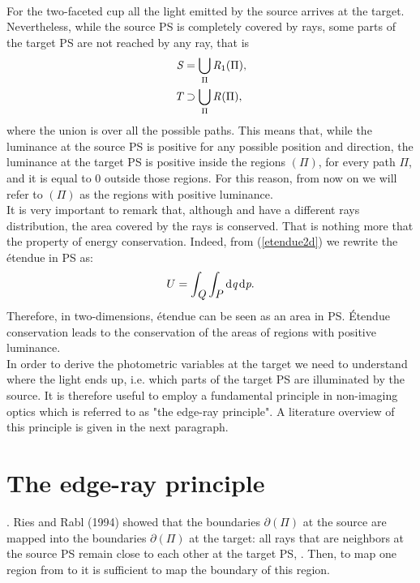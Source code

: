 \\ \indent For the two-faceted cup all the light emitted by the source arrives at the target. Nevertheless, while the source PS is completely covered by rays, some parts of the target PS are not reached by any ray, that is
\begin{equation}
\begin{aligned}
\mbox{$\emph{S}_{\textit{}}$} &= \bigcup_{\Pi} \mbox{$\emph{R}_{\textit{$1$}}$}(\Pi),\\
\mbox{$\emph{T}_{\textit{}}$} &\supset \bigcup_{\Pi} \mbox{$\emph{R}_{\textit{}}$}(\Pi),
\end{aligned}
\end{equation}
where the union is over all the possible paths.
This means that, while the luminance at the source PS is positive for any possible position and direction, the luminance at the target PS is positive inside the regions $(\Pi)$, for every path $\Pi$, and it is equal to $0$ outside those regions. For this reason, from now on we will refer to $(\Pi)$ as the regions with positive luminance.\\ \indent
It is very important to remark that, although  and  have a different rays distribution, the area covered by the rays is conserved. That is nothing more that the property of energy conservation. Indeed, from (\ref{etendue2d}) we rewrite the \'{e}tendue in PS as:
\begin{equation}
U = \int_{\mbox{$\emph{Q}_{\textit{}}$}}\int_{\mbox{$\emph{P}_{\textit{}}$}} \textrm{d}\textit{q}\,\textrm{d}\textit{p}.
\end{equation}
Therefore, in two-dimensions, \'{e}tendue can be seen as an area in PS.  \'{E}tendue conservation leads to the conservation of the areas of regions with positive luminance.\\ \indent
In order to derive the photometric variables at the target we need to understand where the light ends up, i.e. which parts of the target PS are illuminated by the source.
It is therefore useful to employ a fundamental principle in non-imaging optics which is referred to as "the edge-ray principle". A literature overview of this principle is given in the next paragraph.
\section{The edge-ray principle}
\cite{welford1978problem}.
Ries and Rabl (1994) showed that the boundaries 
$\partial$$(\Pi)$ at the source are mapped into the boundaries $\partial$$(\Pi)$ at the target: 
all rays that are neighbors at the source PS remain close to each other at the target PS, \cite{Ries:2}. 
Then, to map one region from  to  it is sufficient to map the boundary of this region.
